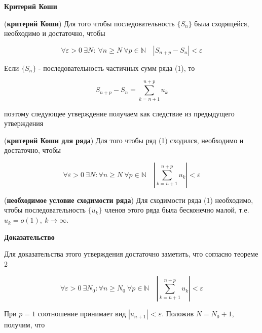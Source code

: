 \textbf{Критерий Коши}

\begin{theorem}
	(\textbf{критерий Коши}) Для того чтобы последовательность $\{S_n\}$ была сходящейся, необходимо и достаточно, чтобы
	
	\begin{equation*}
		\forall\varepsilon > 0 \: \exists N: \: \forall n \geqslant N \: \forall p \in \mathbb{N} \quad |S_{n + p} - S_n| < \varepsilon
	\end{equation*}
	
	Если $\{S_n\}$ - последовательность частичных сумм ряда (1), то
	
	\begin{equation*}
		S_{n + p} - S_n = \displaystyle\sum_{k = n + 1}^{n + p} u_k
	\end{equation*}
	
	поэтому следующее утверждение получаем как следствие из предыдущего утверждения
\end{theorem}

\begin{theorem}
	(\textbf{критерий Коши для ряда}) Для того чтобы ряд (1) сходился, необходимо и достаточно, чтобы
	
	\begin{equation}
		\forall\varepsilon > 0 \ \exists N: \forall n \geqslant N \ \forall p \in\mathbb{N} \quad \left|\displaystyle\sum_{k = n + 1}^{n + p} u_k \right| < \varepsilon
	\end{equation}
\end{theorem}

\begin{follows}
	(\textbf{необходимое условие сходимости ряда}) Для сходимости ряда (1) необходимо, чтобы последовательность $\{u_k\}$ членов этого ряда была бесконечно малой, т.е. $u_k = o(1),\ k\rightarrow\infty$.
\end{follows}

\textbf{Доказательство}

Для доказательства этого утверждения достаточно заметить, что согласно теореме 2

\begin{equation*}
	\forall\varepsilon > 0 \ \exists N_0: \forall n \geqslant N_0 \ \forall p \in \mathbb{N} \quad \left| \displaystyle\sum_{k = n + 1}^{n + p} u_k \right| < \varepsilon
\end{equation*}

При $p = 1$ соотношение принимает вид $|u_{n + 1}|$ < $\varepsilon$. Положив $N = N_0 + 1$, получим, что

